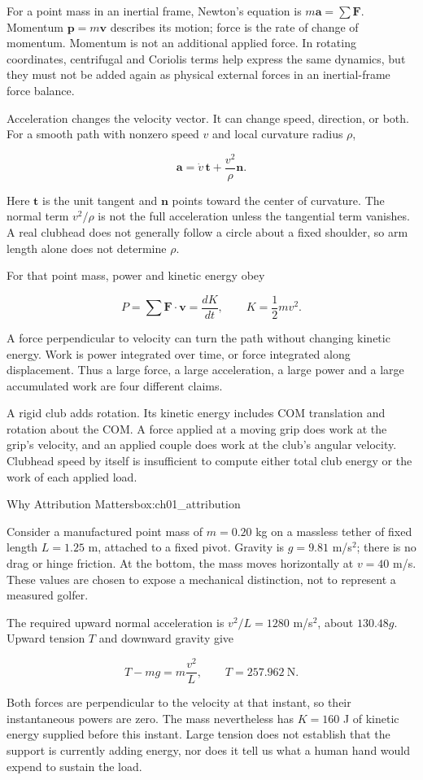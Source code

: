 For a point mass in an inertial frame, Newton's equation is \(m\bm a=\sum\bm F\). Momentum \(\bm p=m\bm v\) describes its motion; force is the rate of change of momentum. Momentum is not an additional applied force. In rotating coordinates, centrifugal and Coriolis terms help express the same dynamics, but they must not be added again as physical external forces in an inertial-frame force balance.

Acceleration changes the velocity vector. It can change speed, direction, or both. For a smooth path with nonzero speed \(v\) and local curvature radius \(\rho\),

\[
\bm a=\dot v\,\bm t+\frac{v^2}{\rho}\bm n.
\]

Here \(\bm t\) is the unit tangent and \(\bm n\) points toward the center of curvature. The normal term \(v^2/\rho\) is not the full acceleration unless the tangential term vanishes. A real clubhead does not generally follow a circle about a fixed shoulder, so arm length alone does not determine \(\rho\).

For that point mass, power and kinetic energy obey

\[
P=\sum\bm F\cdot\bm v=\frac{dK}{dt},\qquad
K=\frac12mv^2.
\]

A force perpendicular to velocity can turn the path without changing kinetic energy. Work is power integrated over time, or force integrated along displacement. Thus a large force, a large acceleration, a large power and a large accumulated work are four different claims.

A rigid club adds rotation. Its kinetic energy includes COM translation and rotation about the COM. A force applied at a moving grip does work at the grip's velocity, and an applied couple does work at the club's angular velocity. Clubhead speed by itself is insufficient to compute either total club energy or the work of each applied load.

\begin{laymansbox}{Why Attribution Matters}{box:ch01_attribution}

Consider a manufactured point mass of \(m=0.20\) kg on a massless tether of fixed length \(L=1.25\) m, attached to a fixed pivot. Gravity is \(g=9.81\) m/s\(^2\); there is no drag or hinge friction. At the bottom, the mass moves horizontally at \(v=40\) m/s. These values are chosen to expose a mechanical distinction, not to represent a measured golfer.

The required upward normal acceleration is \(v^2/L=1280\) m/s\(^2\), about \(130.48g\). Upward tension \(T\) and downward gravity give

\[
T-mg=m\frac{v^2}{L},\qquad T=257.962\ \mathrm N.
\]

Both forces are perpendicular to the velocity at that instant, so their instantaneous powers are zero. The mass nevertheless has \(K=160\) J of kinetic energy supplied before this instant. Large tension does not establish that the support is currently adding energy, nor does it tell us what a human hand would expend to sustain the load.

\end{laymansbox}

